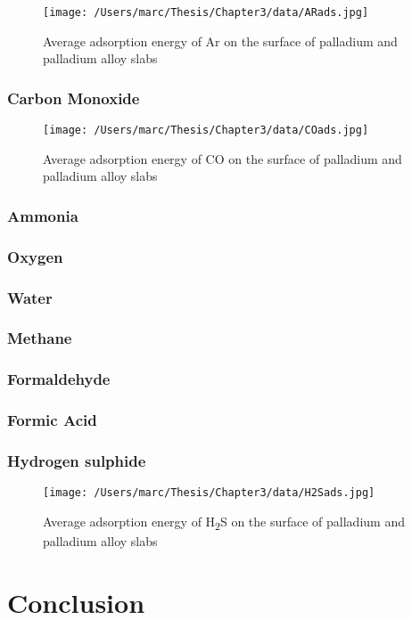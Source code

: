     \begin{landscape}
        \begin{figure}
            \centering
            \texttt{[image: /Users/marc/Thesis/Chapter3/data/ARads.jpg]}
            \caption{Average adsorption energy of Ar on the surface of palladium and palladium alloy slabs}
            \label{Arads}
          \end{figure}
        
        \end{landscape}
\subsubsection{Carbon Monoxide}

\begin{landscape}
    \begin{figure}
        \centering
        \texttt{[image: /Users/marc/Thesis/Chapter3/data/COads.jpg]}
        \caption{Average adsorption energy of CO on the surface of palladium and palladium alloy slabs}
        \label{coads}
      \end{figure}
    
    \end{landscape}
\subsubsection{Ammonia}
\subsubsection{Oxygen}
\subsubsection{Water}
\subsubsection{Methane}
\subsubsection{Formaldehyde}
\subsubsection{Formic Acid}
\subsubsection{Hydrogen sulphide}
\begin{landscape}

\begin{figure}
    \centering
    \texttt{[image: /Users/marc/Thesis/Chapter3/data/H2Sads.jpg]}
    \caption{Average adsorption energy of H\textsubscript{2}S on the surface of palladium and palladium alloy slabs}
    \label{h2sads}
  \end{figure}
\end{landscape}


\section{Conclusion}

